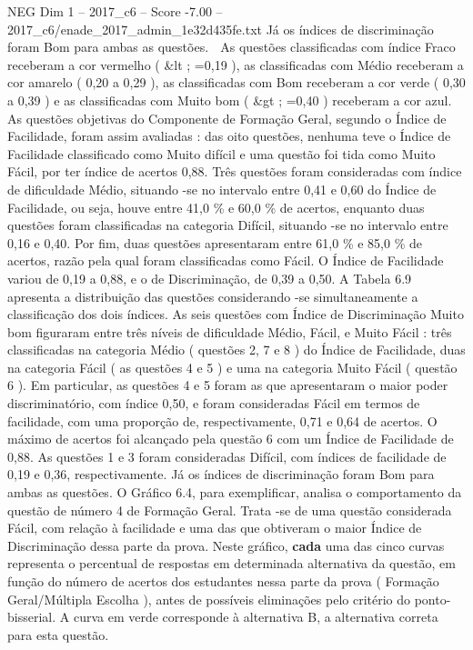 \begin{textsample}{NEG Dim 1 – 2017\_c6 – Score -7.00 – 2017\_c6/enade\_2017\_admin\_1e32d435fe.txt}
Já os índices de discriminação foram Bom para ambas as questões.  As questões classificadas com índice Fraco receberam a cor vermelho ( \&lt ; =0,19 ), as classificadas com Médio receberam a cor amarelo ( 0,20 a 0,29 ), as classificadas com Bom receberam a cor verde ( 0,30 a 0,39 ) e as classificadas com Muito bom ( \&gt ; =0,40 ) receberam a cor azul.
As questões objetivas do Componente de Formação Geral, segundo o Índice de Facilidade, foram assim avaliadas : das oito questões, nenhuma teve o Índice de Facilidade classificado como Muito difícil e uma questão foi tida como Muito Fácil, por ter índice de acertos 0,88.
Três questões foram consideradas com índice de dificuldade Médio, situando -se no intervalo entre 0,41 e 0,60 do Índice de Facilidade, ou seja, houve entre 41,0 \% e 60,0 \% de acertos, enquanto duas questões foram classificadas na categoria Difícil, situando -se no intervalo entre 0,16 e 0,40.
Por fim, duas questões apresentaram entre 61,0 \% e 85,0 \% de acertos, razão pela qual foram classificadas como Fácil.
O Índice de Facilidade variou de 0,19 a 0,88, e o de Discriminação, de 0,39 a 0,50.
A Tabela 6.9 apresenta a distribuição das questões considerando -se simultaneamente a classificação dos dois índices.
As seis questões com Índice de Discriminação Muito bom figuraram entre três níveis de dificuldade Médio, Fácil, e Muito Fácil : três classificadas na categoria Médio ( questões 2, 7 e 8 ) do Índice de Facilidade, duas na categoria Fácil ( as questões 4 e 5 ) e uma na categoria Muito Fácil ( questão 6 ).
Em particular, as questões 4 e 5 foram as que apresentaram o maior poder discriminatório, com índice 0,50, e foram consideradas Fácil em termos de facilidade, com uma proporção de, respectivamente, 0,71 e 0,64 de acertos.
O máximo de acertos foi alcançado pela questão 6 com um Índice de Facilidade de 0,88.
As questões 1 e 3 foram consideradas Difícil, com índices de facilidade de 0,19 e 0,36, respectivamente.
Já os índices de discriminação foram Bom para ambas as questões.
O Gráfico 6.4, para exemplificar, analisa o comportamento da questão de número 4 de Formação Geral.
Trata -se de uma questão considerada Fácil, com relação à facilidade e uma das que obtiveram o maior Índice de Discriminação dessa parte da prova.
Neste gráfico, \textbf{cada} uma das cinco curvas representa o percentual de respostas em determinada alternativa da questão, em função do número de acertos dos estudantes nessa parte da prova ( Formação Geral/Múltipla Escolha ), antes de possíveis eliminações pelo critério do ponto-bisserial.
A curva em verde corresponde à alternativa B, a alternativa correta para esta questão.

\end{textsample}

